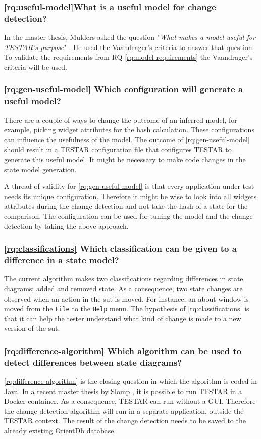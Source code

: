 \subsubsection{\ref{rq:useful-model}What is a useful model for change detection?}
In the master thesis, Mulders asked the question "\textit{What makes a model useful for TESTAR's purpose}" \cite{thesisMulders}. He used the Vaandrager's criteria \cite{vaandrager} to answer that question. To validate the requirements from RQ \ref{rq:model-requirements} the Vaandrager's criteria will be used. 

\subsubsection{\ref{rq:gen-useful-model} Which configuration will generate a useful model?}
There are a couple of ways to change the outcome of an inferred model, for example, picking widget attributes for the hash calculation. These configurations can influence the usefulness of the model. The outcome of \ref{rq:gen-useful-model} should result in a TESTAR configuration file that configures TESTAR to generate this useful model. It might be necessary to make code changes in the state model generation.

A thread of validity for \ref{rq:gen-useful-model} is that every application under test needs its unique configuration. Therefore it might be wise to look into all widgets attributes during the change detection and not take the hash of a state for the comparison. The configuration can be used for tuning the model and the change detection by taking the above approach.

\subsubsection{\ref{rq:classifications} Which classification can be given to a difference in a state model?}
The current algorithm \cite{stateDiff} makes two classifications regarding differences in state diagrams; added and removed state. As a consequence, two state changes are observed when an action in the \acrshort{sut} is moved. For instance, an about window is moved from the \verb|File| to the \verb|Help| menu. The hypothesis of \ref{rq:classifications} is that it can help the tester understand what kind of change is made to a new version of the \acrshort{sut}.

\subsubsection{\ref{rq:difference-algorithm} Which algorithm can be used to detect differences between state diagrams?}
\ref{rq:difference-algorithm} is the closing question in which the algorithm is coded in Java. In a recent master thesis by Slomp \cite{insert-slomp-hereTODO}, it is possible to run TESTAR in a Docker container. As a consequence, TESTAR can run without a GUI. Therefore the change detection algorithm will run in a separate application, outside the TESTAR context. The result of the change detection needs to be saved to the already existing OrientDb database. 

